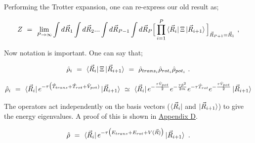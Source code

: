 \documentclass[11pt]{article}
\begin{document}
Performing the Trotter expansion, one can re-express our old result as;

\begin{equation} \label{wr-eq-53-1}
Z \hspace{0.125cm} = \hspace{0.125cm}  \lim_{P \rightarrow \infty} \int d \vec{R}_1 \int d \vec{R}_2 ... \int d \vec{R}_{P - 1} \int d \vec{R}_P \Big[ \prod_{i=1}^{P} \bra{\vec{R}_i} \Xi \ket{\vec{R}_{i+1}} \Big]_{\vec{R}_{P+1} = \vec{R}_1} \hspace{0.125cm} , 
\end{equation}

Now notation is important. One can say that;

\begin{equation} \label{wr-eq-54-1}
\hat{\rho}_i \hspace{0.125cm} = \hspace{0.125cm} \bra{\vec{R}_i} \Xi \ket{\vec{R}_{i+1}} \hspace{0.125cm} = \hspace{0.125cm} \hat{\rho}_{trans_i} \hat{\rho}_{rot_i} \hat{\rho}_{pot_i} \hspace{0.125cm} . 
\end{equation}

\begin{equation} \label{wr-eq-56-1}
\hat{\rho}_i \hspace{0.125cm} = \hspace{0.125cm} \bra{\vec{R}_i} e^{ - \tau \big( \hat{T}_{trans} + \hat{T}_{rot} + \hat{V}_{pot} ) } \ket{\vec{R}_{i+1}}  \hspace{0.125cm} \simeq \hspace{0.125cm} \bra{\vec{R}_{i}} e^{- \frac{ \tau \hat{V}_{pot}}{2}} e^{- \frac{\tau \hat{p}^2}{2 m}} e^{-\tau \hat{T}_{rot}} e^{- \frac{ \tau \hat{V}_{pot}}{2}}  \ket{\vec{R}_{i+1}}
\end{equation}

The operators act independently on the basis vectors (\begin{math} \bra{\vec{R}_i} \end{math} and \begin{math} \ket{\vec{R}_{i+1}} \end{math}) to give the energy eigenvalues. A proof of this is shown in \hyperlink{wr-appendix-d}{Appendix D}.

\begin{equation} \label{wr-eq-57-1}
\hat{\rho} \hspace{0.125cm} = \hspace{0.125cm} \bra{\vec{R}_i} e^{ - \tau \big( E_{trans} + E_{rot} + V(\vec{R})\big) } \ket{\vec{R}_{i+1}} \hspace{0.125cm} .
\end{equation}
\end{document}

